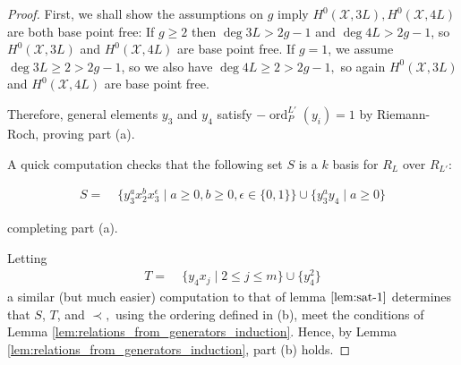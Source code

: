 \documentclass{amsart}
\theoremstyle{plain}
\theoremstyle{definition}
\theoremstyle{remark}
\numberwithin{equation}{section}
\newcommand \sx{\mathscr X}
\DeclareMathOperator{\ord}{ord}
\newcommand{\halfcan}{L}
\DeclareMathOperator{\initial}{in_\prec}
\begin{document}
\begin{proof}
First, we shall show the assumptions on $g$ imply $H^0(\sx, 3L), H^0(\sx, 4L)$ are both base point free: If $g \geq 2$ then $\deg 3L > 2g - 1$  and $\deg 4L > 2g - 1$, so $H^0(\sx, 3L)$ and $H^0(\sx, 4L)$ are base point free. If $g = 1$, we assume $\deg 3L \geq 2 > 2g - 1$, so we also have $\deg 4L \geq 2 > 2g - 1,$ so again $H^0(\sx, 3L)$ and $H^0(\sx, 4L)$ are base point free. 

Therefore, general elements $y_3$ and $y_4$ satisfy $-\ord_P^{\halfcan'}(y_i) = 1$ by Riemann-Roch, proving part (a). 

A quick computation checks that
the following set $S$ is a $k$ basis for $R_\halfcan$ over $R_{\halfcan'}$:

\begin{align}
\label{eqn:sat_two_add_generator}
	S =	& \; \{ y_3^ax_2^b x_3^\epsilon \mid a \geq 0, b 
		\geq 0, \epsilon \in \{0, 1\}\} \cup \{ y_3^ay_4 \mid a \geq 0 \}
\end{align}

\noindent
completing part (a).

Letting
\begin{align*}
	T =   &\; \{ y_4 x_j \mid 2 \leq j \leq m \}\cup \{ y_4^2 \}
\end{align*}
a similar (but much easier) computation to that of lemma $\ref{lem:sat-1}$ determines that $S$, $T$, and $\prec,$ using the ordering defined in (b), meet the conditions of 
Lemma \ref{lem:relations_from_generators_induction}. 
Hence, by Lemma \ref{lem:relations_from_generators_induction}, part (b) holds.



\end{proof}
\end{document}
